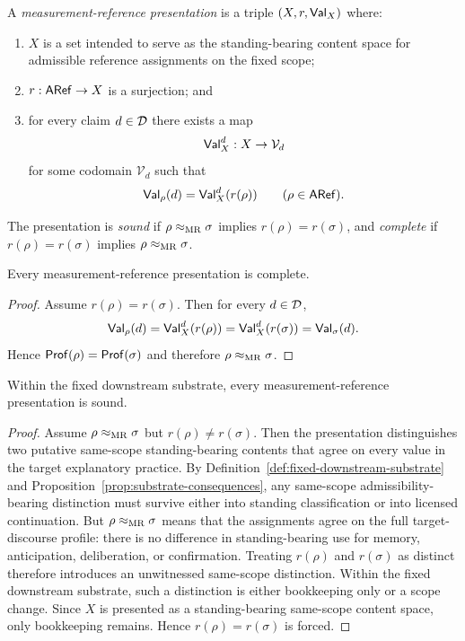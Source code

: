 \begin{definition}
\label{def:mr-presentation}
A \emph{measurement-reference presentation} is a triple $(X,r,\mathsf{Val}_X)$ where:
\begin{enumerate}
    \item $X$ is a set intended to serve as the standing-bearing content space for admissible
    reference assignments on the fixed scope;
    \item $r:\mathsf{ARef}\to X$ is a surjection; and
    \item for every claim $d\in\mathcal{D}$ there exists a map
    \[
    \mathsf{Val}_X^d:X\to \mathcal V_d
    \]
    for some codomain $\mathcal V_d$ such that
    \[
    \mathsf{Val}_\rho(d)=\mathsf{Val}_X^d(r(\rho))
    \qquad (\rho\in\mathsf{ARef}).
    \]
\end{enumerate}
The presentation is \emph{sound} if $\rho\mathrel{\approx_{\mathrm{MR}}}\sigma$ implies $r(\rho)=r(\sigma)$, and \emph{complete}
if $r(\rho)=r(\sigma)$ implies $\rho\mathrel{\approx_{\mathrm{MR}}}\sigma$.
\end{definition}

\begin{lemma}
\label{lem:mr-complete}
Every measurement-reference presentation is complete.
\end{lemma}

\begin{proof}
Assume $r(\rho)=r(\sigma)$. Then for every $d\in\mathcal{D}$,
\[
\mathsf{Val}_\rho(d)=\mathsf{Val}_X^d(r(\rho))=\mathsf{Val}_X^d(r(\sigma))=\mathsf{Val}_\sigma(d).
\]
Hence $\mathsf{Prof}(\rho)=\mathsf{Prof}(\sigma)$ and therefore $\rho\mathrel{\approx_{\mathrm{MR}}}\sigma$.
\end{proof}

\begin{lemma}
\label{lem:mr-sound}
Within the fixed downstream substrate, every measurement-reference presentation is sound.
\end{lemma}

\begin{proof}
Assume $\rho\mathrel{\approx_{\mathrm{MR}}}\sigma$ but $r(\rho)\neq r(\sigma)$. Then the presentation distinguishes two putative
same-scope standing-bearing contents that agree on every value in the target explanatory practice.
By Definition~\ref{def:fixed-downstream-substrate} and Proposition~\ref{prop:substrate-consequences},
any same-scope admissibility-bearing distinction must survive either into standing classification or into
licensed continuation. But $\rho\mathrel{\approx_{\mathrm{MR}}}\sigma$ means that the assignments agree on the full target-discourse
profile: there is no difference in standing-bearing use for memory, anticipation, deliberation, or
confirmation. Treating $r(\rho)$ and $r(\sigma)$ as distinct therefore introduces an unwitnessed
same-scope distinction. Within the fixed downstream substrate, such a distinction is either bookkeeping
only or a scope change. Since $X$ is presented as a standing-bearing same-scope content space, only
bookkeeping remains. Hence $r(\rho)=r(\sigma)$ is forced.
\end{proof}


